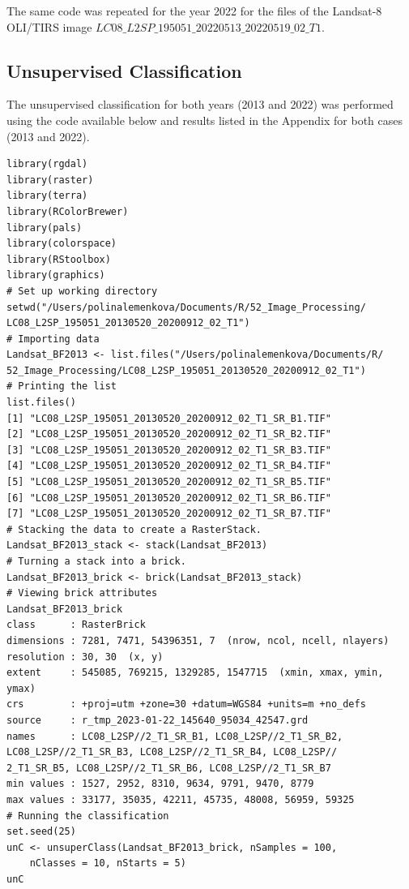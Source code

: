 \documentclass[atmosphere,article,submit,pdftex,moreauthors]{Definitions/mdpi}
\begin{document}
The same code was repeated for the year 2022 for the files of the Landsat-8 OLI/TIRS image $LC08\_L2SP\_195051\_20220513\_20220519\_02\_T1$.

 \subsection{Unsupervised Classification}
The unsupervised classification for both years (2013 and 2022) was performed using the code available below and results listed in the Appendix for both cases (2013 and 2022). 

\begin{small}
\begin{verbatim}
library(rgdal)
library(raster)
library(terra)
library(RColorBrewer)
library(pals)
library(colorspace)
library(RStoolbox)
library(graphics)
# Set up working directory
setwd("/Users/polinalemenkova/Documents/R/52_Image_Processing/
LC08_L2SP_195051_20130520_20200912_02_T1")
# Importing data
Landsat_BF2013 <- list.files("/Users/polinalemenkova/Documents/R/
52_Image_Processing/LC08_L2SP_195051_20130520_20200912_02_T1")
# Printing the list
list.files()
[1] "LC08_L2SP_195051_20130520_20200912_02_T1_SR_B1.TIF"
[2] "LC08_L2SP_195051_20130520_20200912_02_T1_SR_B2.TIF"
[3] "LC08_L2SP_195051_20130520_20200912_02_T1_SR_B3.TIF"
[4] "LC08_L2SP_195051_20130520_20200912_02_T1_SR_B4.TIF"
[5] "LC08_L2SP_195051_20130520_20200912_02_T1_SR_B5.TIF"
[6] "LC08_L2SP_195051_20130520_20200912_02_T1_SR_B6.TIF"
[7] "LC08_L2SP_195051_20130520_20200912_02_T1_SR_B7.TIF"
# Stacking the data to create a RasterStack. 
Landsat_BF2013_stack <- stack(Landsat_BF2013)
# Turning a stack into a brick. 
Landsat_BF2013_brick <- brick(Landsat_BF2013_stack)
# Viewing brick attributes
Landsat_BF2013_brick
class      : RasterBrick 
dimensions : 7281, 7471, 54396351, 7  (nrow, ncol, ncell, nlayers)
resolution : 30, 30  (x, y)
extent     : 545085, 769215, 1329285, 1547715  (xmin, xmax, ymin, ymax)
crs        : +proj=utm +zone=30 +datum=WGS84 +units=m +no_defs 
source     : r_tmp_2023-01-22_145640_95034_42547.grd 
names      : LC08_L2SP//2_T1_SR_B1, LC08_L2SP//2_T1_SR_B2, 
LC08_L2SP//2_T1_SR_B3, LC08_L2SP//2_T1_SR_B4, LC08_L2SP//
2_T1_SR_B5, LC08_L2SP//2_T1_SR_B6, LC08_L2SP//2_T1_SR_B7 
min values : 1527, 2952, 8310, 9634, 9791, 9470, 8779 
max values : 33177, 35035, 42211, 45735, 48008, 56959, 59325
# Running the classification
set.seed(25)
unC <- unsuperClass(Landsat_BF2013_brick, nSamples = 100, 
	nClasses = 10, nStarts = 5)
unC
\end{verbatim} 
\end{small}
\end{document}
